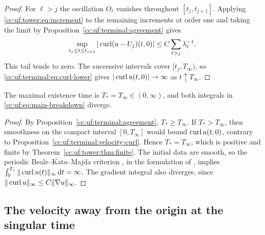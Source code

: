 \begin{proof}
For $\ell>j$ the oscillation $O_\ell$ vanishes throughout $[t_j,t_{j+1}]$.
Applying \eqref{cc:uf:tower:eq:increment} to the remaining increments
at order one and taking the limit by Proposition~\ref{cc:uf:terminal:agreement}
gives
\[
 \sup_{t_j\le t\le t_{j+1}}|\operatorname{curl}(u-U_j)(t,0)|
 \le C\sum_{\ell>j}\lambda_\ell^{-1}.
\]
This tail tends to zero. The successive intervals cover
$[t_j,T_\infty)$, so \eqref{cc:uf:terminal:eq:curl-lower} gives
$|\operatorname{curl} u(t,0)|\to\infty$ as $t\uparrow T_\infty$.
\end{proof}

\begin{corollary}\label{cc:uf:terminal:time}
The maximal existence time is $T_*=T_\infty\in(0,\infty)$, and
both integrals in \eqref{cc:uf:eq:main-breakdown} diverge.
\end{corollary}
\begin{proof}
By Proposition~\ref{cc:uf:terminal:agreement}, $T_*\ge T_\infty$. If
$T_*>T_\infty$, then smoothness on the compact interval $[0,T_\infty]$
would bound $\operatorname{curl} u(t,0)$, contrary to
Proposition~\ref{cc:uf:terminal:velocity-curl}. Hence $T_*=T_\infty$,
which is positive and finite by Theorem~\ref{cc:uf:tower:thm:finite}.
The initial data are smooth, so the periodic Beale--Kato--Majda criterion
\cite{BKM}, in the formulation of \cite[Theorem~1]{GGPP}, implies
$\int_0^{T_*}\|\operatorname{curl} u(t)\|_\infty\,\mathrm d t=\infty$.
The gradient integral also diverges, since
$\|\operatorname{curl} u\|_\infty\le C\|\nabla u\|_\infty$.
\end{proof}

\subsection{The velocity away from the origin at the singular time}

